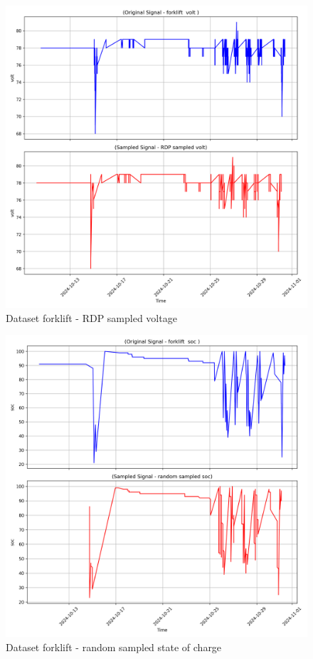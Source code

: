 \begin{figure}
    \centering
    \includegraphics[width=1\linewidth]{screenshots/forklift/RDP_sampled_volt_screenshot.png}
    \caption{Dataset forklift - RDP sampled voltage }
    \label{fig:forklift_RDP_sampled_volt_screenshot}
\end{figure}
\begin{figure}
    \centering
    \includegraphics[width=1\linewidth]{screenshots/forklift/random_sampled_soc_screenshot.png}
    \caption{Dataset forklift - random sampled state of charge }
    \label{fig:forklift_random_sampled_soc_screenshot}
\end{figure}
